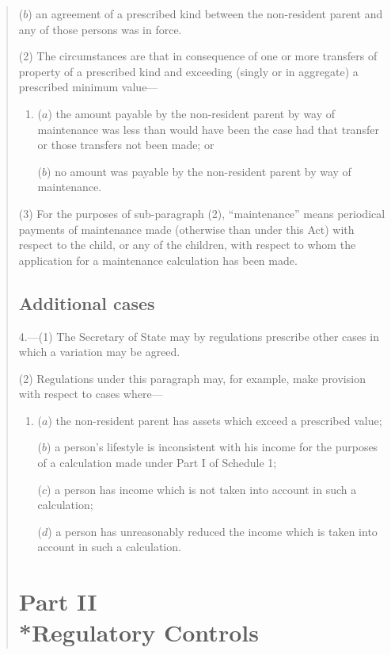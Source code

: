 \documentclass[12pt,a4paper]{article}
\begin{document}
\begin{quotation}
\begin{enumerate}
($b$) an agreement of a prescribed kind between the non-resident parent and any of those persons was in force.
\end{enumerate}

(2) The circumstances are that in consequence of one or more transfers of property of a prescribed kind and exceeding (singly or in aggregate) a prescribed minimum value—
\begin{enumerate}\item[]
($a$) the amount payable by the non-resident parent by way of maintenance was less than would have been the case had that transfer or those transfers not been made; or

($b$) no amount was payable by the non-resident parent by way of maintenance.
\end{enumerate}

(3) For the purposes of sub-paragraph (2), “maintenance” means periodical payments of maintenance made (otherwise than under this Act) with respect to the child, or any of the children, with respect to whom the application for a maintenance calculation has been made.

\subsection*{Additional cases}

4.---(1) The Secretary of State may by regulations prescribe other cases in which a variation may be agreed.

(2) Regulations under this paragraph may, for example, make provision with respect to cases where—
\begin{enumerate}\item[]
($a$) the non-resident parent has assets which exceed a prescribed value;

($b$) a person’s lifestyle is inconsistent with his income for the purposes of a calculation made under Part I of Schedule 1;

($c$) a person has income which is not taken into account in such a calculation;

($d$) a person has unreasonably reduced the income which is taken into account in such a calculation.
\end{enumerate}

\section*{Part II\\*Regulatory Controls}


\end{quotation}
\end{document}
